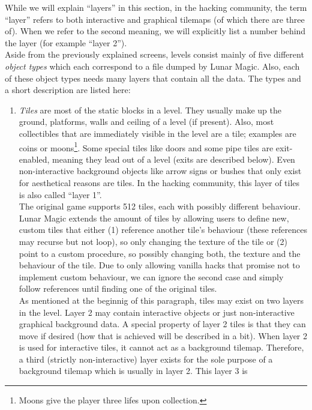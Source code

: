 While we will explain ``layers'' in this section, in the hacking
community, the term ``layer'' refers to both interactive and graphical
tilemaps (of which there are three of). When we refer to the second
meaning, we will explicitly list a number behind the layer (for
example ``layer 2''). \\
Aside from the previously explained screens, levels consist mainly of
five different \emph{object types} which each correspond to a file
dumped by Lunar Magic. Also, each of these object types needs many
layers that contain all the data. The types and a short description
are listed here:
\begin{enumerate}
\item \emph{Tiles} are most of the static blocks in a level. They
  usually make up the ground, platforms, walls and ceiling of a level
  (if present). Also, most collectibles that are immediately visible
  in the level are a tile; examples are coins or moons\footnote{Moons
    give the player three lifes upon collection.}. Some special tiles
  like doors and some pipe tiles are exit-enabled, meaning they lead
  out of a level (exits are described below). Even non-interactive
  background objects like arrow signs or bushes that only exist for
  aesthetical reasons are tiles. In the hacking community, this layer
  of tiles is also called ``layer 1''. \\
  The original game supports 512 tiles, each with possibly different
  behaviour. Lunar Magic extends the amount of tiles by allowing users
  to define new, custom tiles that either (1) reference another tile's
  behaviour (these references may recurse but not loop), so only
  changing the texture of the tile or (2) point to a custom procedure,
  so possibly changing both, the texture and the behaviour of the
  tile. Due to only allowing vanilla hacks that promise not to
  implement custom behaviour, we can ignore the second case and simply
  follow references until finding one of the original tiles. \\
  As mentioned at the beginnig of this paragraph, tiles may exist on
  two layers in the level. Layer 2 may contain interactive objects or
  just non-interactive graphical background data. A special property
  of layer 2 tiles is that they can move if desired (how that is
  achieved will be described in a bit). When layer 2 is used for
  interactive tiles, it cannot act as a background tilemap. Therefore,
  a third (strictly non-interactive) layer exists for the sole purpose
  of a background tilemap which is usually in layer 2. This layer 3 is

\end{enumerate}
